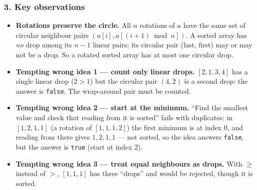 \begin{diagrambox}
\end{diagrambox}

\subsubsection*{3. Key observations}

\begin{itemize}[leftmargin=*]
    \item \textbf{Rotations preserve the circle.} All $n$ rotations of $a$ have the same set of circular neighbour pairs $(a[i], a[(i+1) \bmod n])$. A sorted array has \emph{no} drop among its $n-1$ linear pairs; its circular pair (last, first) may or may not be a drop. So a rotated sorted array has at most one circular drop.
    \item \textbf{Tempting wrong idea 1 --- count only linear drops.} $[2,1,3,4]$ has a single linear drop ($2 > 1$) but the circular pair $(4, 2)$ is a second drop: the answer is \texttt{false}. The wrap-around pair must be counted.
    \item \textbf{Tempting wrong idea 2 --- start at the minimum.} ``Find the smallest value and check that reading from it is sorted'' fails with duplicates: in $[1,2,1,1]$ (a rotation of $[1,1,1,2]$) the first minimum is at index 0, and reading from there gives $1,2,1,1$ --- not sorted, so the idea answers \texttt{false}, but the answer is \texttt{true} (start at index 2).
    \item \textbf{Tempting wrong idea 3 --- treat equal neighbours as drops.} With $\ge$ instead of $>$, $[1,1,1]$ has three ``drops'' and would be rejected, though it is sorted.
\end{itemize}

